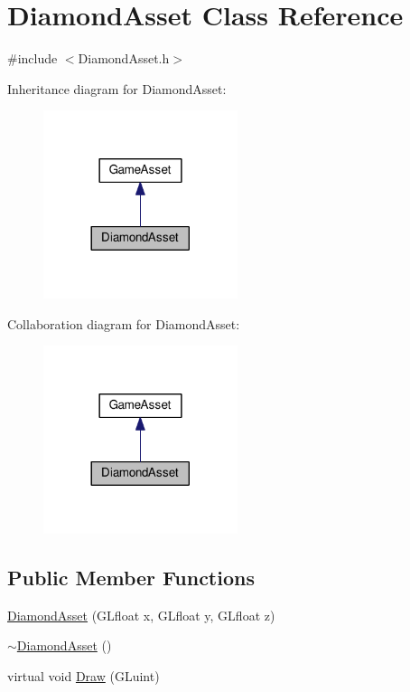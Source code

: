 \hypertarget{classDiamondAsset}{}\section{Diamond\+Asset Class Reference}
\label{classDiamondAsset}


{\ttfamily \#include $<$Diamond\+Asset.\+h$>$}



Inheritance diagram for Diamond\+Asset\+:\nopagebreak
\begin{figure}[H]
\begin{center}
\leavevmode
\includegraphics[width=161pt]{classDiamondAsset__inherit__graph}
\end{center}
\end{figure}


Collaboration diagram for Diamond\+Asset\+:\nopagebreak
\begin{figure}[H]
\begin{center}
\leavevmode
\includegraphics[width=161pt]{classDiamondAsset__coll__graph}
\end{center}
\end{figure}
\subsection*{Public Member Functions}
\begin{DoxyCompactItemize}
\item 
\hyperlink{classDiamondAsset_a6140b65eb30ad5a4141fec20ec7f8fad}{Diamond\+Asset} (G\+Lfloat x, G\+Lfloat y, G\+Lfloat z)
\item 
\hyperlink{classDiamondAsset_a1b7bf6ba76651a9304943f2c41fe36b8}{$\sim$\+Diamond\+Asset} ()
\item 
virtual void \hyperlink{classDiamondAsset_a0c259031894623285b3b511321c73abb}{Draw} (G\+Luint)
\end{DoxyCompactItemize}
